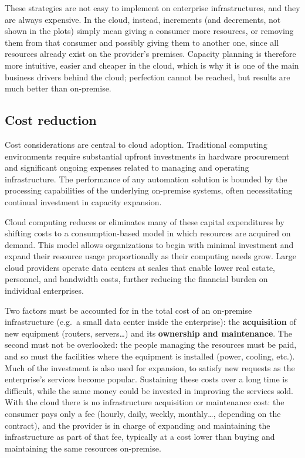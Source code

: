 These strategies are not easy to implement on enterprise infrastructures, and they are always expensive. In the cloud, instead, increments (and decrements, not shown in the plots) simply mean giving a consumer more resources, or removing them from that consumer and possibly giving them to another one, since all resources already exist on the provider's premises. Capacity planning is therefore more intuitive, easier and cheaper in the cloud, which is why it is one of the main business drivers behind the cloud; perfection cannot be reached, but results are much better than on-premise.

\subsection{Cost reduction}

Cost considerations are central to cloud adoption. Traditional computing environments require substantial upfront investments in hardware procurement and significant ongoing expenses related to managing and operating infrastructure. The performance of any automation solution is bounded by the processing capabilities of the underlying on-premise systems, often necessitating continual investment in capacity expansion.

Cloud computing reduces or eliminates many of these capital expenditures by shifting costs to a consumption-based model in which resources are acquired on demand. This model allows organizations to begin with minimal investment and expand their resource usage proportionally as their computing needs grow. Large cloud providers operate data centers at scales that enable lower real estate, personnel, and bandwidth costs, further reducing the financial burden on individual enterprises.

Two factors must be accounted for in the total cost of an on-premise infrastructure (e.g.\ a small data center inside the enterprise): the \textbf{acquisition} of new equipment (routers, servers\ldots) and its \textbf{ownership and maintenance}. The second must not be overlooked: the people managing the resources must be paid, and so must the facilities where the equipment is installed (power, cooling, etc.). Much of the investment is also used for expansion, to satisfy new requests as the enterprise's services become popular. Sustaining these costs over a long time is difficult, while the same money could be invested in improving the services sold. With the cloud there is no infrastructure acquisition or maintenance cost: the consumer pays only a fee (hourly, daily, weekly, monthly\ldots, depending on the contract), and the provider is in charge of expanding and maintaining the infrastructure as part of that fee, typically at a cost lower than buying and maintaining the same resources on-premise.

